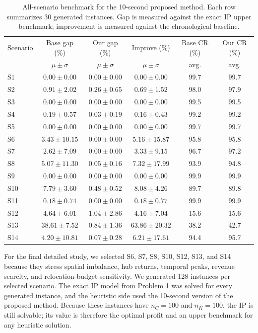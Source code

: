 \documentclass[10pt,a4paper]{article}
\begin{document}
\begin{table}[htbp]
\centering
\small
\setlength{\tabcolsep}{3pt}
\caption{All-scenario benchmark for the 10-second proposed method.  Each row
summarizes 30 generated instances.  Gap is measured against the exact IP upper
benchmark; improvement is measured against the chronological baseline.}
\label{tab:bench_all}
\begin{tabular}{lccc|cc}
\toprule
Scenario & Base gap (\%) & Our gap (\%) & Improve (\%) & Base CR (\%) & Our CR (\%)\\
& $\mu \pm \sigma$ & $\mu \pm \sigma$ & $\mu \pm \sigma$ & avg. & avg.\\
\midrule
S1  & $0.00 \pm 0.00$ & $0.00 \pm 0.00$ & $0.00 \pm 0.00$ & 99.7 & 99.7\\
S2  & $0.91 \pm 2.02$ & $0.26 \pm 0.65$ & $0.69 \pm 1.52$ & 98.0 & 97.9\\
S3  & $0.00 \pm 0.00$ & $0.00 \pm 0.00$ & $0.00 \pm 0.00$ & 99.5 & 99.5\\
S4  & $0.19 \pm 0.57$ & $0.03 \pm 0.19$ & $0.16 \pm 0.43$ & 99.2 & 99.2\\
S5  & $0.00 \pm 0.00$ & $0.00 \pm 0.00$ & $0.00 \pm 0.00$ & 99.7 & 99.7\\
S6  & $3.43 \pm 10.15$ & $0.00 \pm 0.00$ & $5.16 \pm 15.87$ & 95.8 & 95.8\\
S7  & $2.62 \pm 7.09$ & $0.00 \pm 0.00$ & $3.33 \pm 9.15$ & 96.7 & 97.2\\
S8  & $5.07 \pm 11.30$ & $0.05 \pm 0.16$ & $7.32 \pm 17.99$ & 93.9 & 94.8\\
S9  & $0.00 \pm 0.00$ & $0.00 \pm 0.00$ & $0.00 \pm 0.00$ & 99.9 & 99.9\\
S10 & $7.79 \pm 3.60$ & $0.48 \pm 0.52$ & $8.08 \pm 4.26$ & 89.7 & 89.8\\
S11 & $0.18 \pm 0.74$ & $0.00 \pm 0.00$ & $0.18 \pm 0.77$ & 99.9 & 99.9\\
S12 & $4.64 \pm 6.01$ & $1.04 \pm 2.86$ & $4.16 \pm 7.04$ & 15.6 & 15.6\\
S13 & $38.61 \pm 7.52$ & $0.84 \pm 1.36$ & $63.86 \pm 20.32$ & 38.2 & 42.7\\
S14 & $4.20 \pm 10.81$ & $0.07 \pm 0.28$ & $6.21 \pm 17.61$ & 94.4 & 95.7\\
\bottomrule
\end{tabular}
\end{table}

For the final detailed study, we selected S6, S7, S8, S10, S12, S13, and S14 because they
stress spatial imbalance, hub returns, temporal peaks, revenue scarcity, and
relocation-budget sensitivity.  We generated 128 instances per selected scenario.  The exact IP
model from Problem 1 was solved for every generated instance, and the heuristic
side used the 10-second version of the proposed method.  Because these instances
have $n_C=100$ and $n_K=100$, the IP is still solvable; its value is therefore
the optimal profit and an upper benchmark for any heuristic solution.
\end{document}

